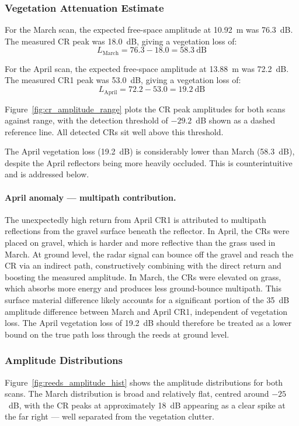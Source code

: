 \subsubsection*{Vegetation Attenuation Estimate}

For the March scan, the expected free-space amplitude at 10.92~m was 76.3~dB.
The measured CR peak was 18.0~dB, giving a vegetation loss of:
\[
  L_{\text{March}} = 76.3 - 18.0 = 58.3~\text{dB}
\]

For the April scan, the expected free-space amplitude at 13.88~m was 72.2~dB.
The measured CR1 peak was 53.0~dB, giving a vegetation loss of:
\[
  L_{\text{April}} = 72.2 - 53.0 = 19.2~\text{dB}
\]

Figure~\ref{fig:cr_amplitude_range} plots the CR peak amplitudes for both
scans against range, with the detection threshold of $-29.2$~dB shown as a
dashed reference line.
All detected CRs sit well above this threshold.

The April vegetation loss (19.2~dB) is considerably lower than March (58.3~dB),
despite the April reflectors being more heavily occluded.
This is counterintuitive and is addressed below.

\paragraph{April anomaly — multipath contribution.}
The unexpectedly high return from April CR1 is attributed to multipath
reflections from the gravel surface beneath the reflector.
In April, the CRs were placed on gravel, which is harder and more reflective
than the grass used in March.
At ground level, the radar signal can bounce off the gravel and reach the CR
via an indirect path, constructively combining with the direct return and
boosting the measured amplitude.
In March, the CRs were elevated on grass, which absorbs more energy and
produces less ground-bounce multipath.
This surface material difference likely accounts for a significant portion
of the 35~dB amplitude difference between March and April CR1, independent
of vegetation loss.
The April vegetation loss of 19.2~dB should therefore be treated as a lower
bound on the true path loss through the reeds at ground level.

\subsubsection*{Amplitude Distributions}

Figure~\ref{fig:reeds_amplitude_hist} shows the amplitude distributions for
both scans.
The March distribution is broad and relatively flat, centred around $-25$~dB,
with the CR peaks at approximately 18~dB appearing as a clear spike at the
far right — well separated from the vegetation clutter.

